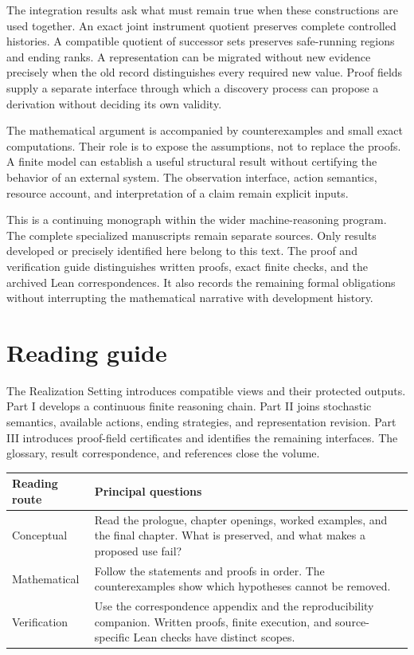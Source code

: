 \documentclass[11pt,oneside,openany]{book}
\theoremstyle{definition}\newtheorem{definition}[theorem]{Definition}
\begin{document}
The integration results ask what must remain true when these constructions are used together. An exact joint instrument quotient preserves complete controlled histories. A compatible quotient of successor sets preserves safe-running regions and ending ranks. A representation can be migrated without new evidence precisely when the old record distinguishes every required new value. Proof fields supply a separate interface through which a discovery process can propose a derivation without deciding its own validity.

The mathematical argument is accompanied by counterexamples and small exact computations. Their role is to expose the assumptions, not to replace the proofs. A finite model can establish a useful structural result without certifying the behavior of an external system. The observation interface, action semantics, resource account, and interpretation of a claim remain explicit inputs.

This is a continuing monograph within the wider machine-reasoning program. The complete specialized manuscripts remain separate sources. Only results developed or precisely identified here belong to this text. The proof and verification guide distinguishes written proofs, exact finite checks, and the archived Lean correspondences. It also records the remaining formal obligations without interrupting the mathematical narrative with development history.

\chapter*{Reading guide}
The Realization Setting introduces compatible views and their protected outputs. Part I develops a continuous finite reasoning chain. Part II joins stochastic semantics, available actions, ending strategies, and representation revision. Part III introduces proof-field certificates and identifies the remaining interfaces. The glossary, result correspondence, and references close the volume.

\begin{center}
\begin{tabular}{@{}p{.23\linewidth}p{.67\linewidth}@{}}\toprule
Reading route & Principal questions\\\midrule
Conceptual & Read the prologue, chapter openings, worked examples, and the final chapter. What is preserved, and what makes a proposed use fail?\\[4pt]
Mathematical & Follow the statements and proofs in order. The counterexamples show which hypotheses cannot be removed.\\[4pt]
Verification & Use the correspondence appendix and the reproducibility companion. Written proofs, finite execution, and source-specific Lean checks have distinct scopes.\\\bottomrule
\end{tabular}
\end{center}
\end{document}
